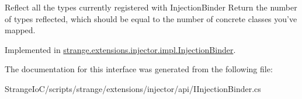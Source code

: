 Reflect all the types currently registered with Injection\-Binder Return the number of types reflected, which should be equal to the number of concrete classes you've mapped. 



Implemented in \hyperlink{classstrange_1_1extensions_1_1injector_1_1impl_1_1_injection_binder_a5a03e345237a56af33953e215852526b}{strange.\-extensions.\-injector.\-impl.\-Injection\-Binder}.



The documentation for this interface was generated from the following file\-:\begin{DoxyCompactItemize}
\item 
Strange\-Io\-C/scripts/strange/extensions/injector/api/I\-Injection\-Binder.\-cs\end{DoxyCompactItemize}

